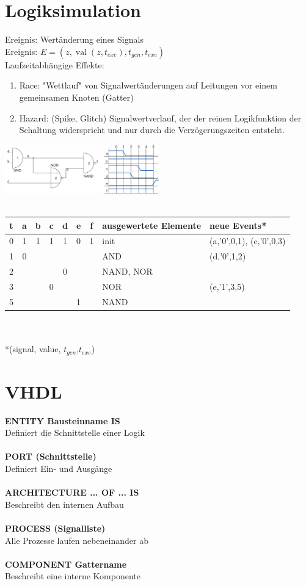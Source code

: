 \documentclass[a4paper,twocolumn,10pt]{article}
\DeclareMathOperator{\val}{val}
\begin{document}
\section*{Logiksimulation}
Ereignis: Wertänderung eines Signals\\
Ereignis: $E=(z, \val(z,t_{exe}),t_{gen},t_{exe})$\\
Laufzeitabhängige Effekte:
\begin{enumerate}
	\item Race: "Wettlauf" von Signalwertänderungen auf Leitungen vor einem gemeinsamen Knoten (Gatter)
	\item Hazard: (Spike, Glitch) Signalwertverlauf, der der reinen Logikfunktion der Schaltung widerspricht und nur durch die Verzögerungszeiten entsteht.
\end{enumerate}
\includegraphics[width=0.5\textwidth]{Grafiken/Logiksimulation}
\\ \\
\begin{tabular}{@{}|c|c|c|c|c|c|c|p{2.3cm}|p{2cm}|@{}}
\hline t & a & b & c & d & e & f & ausgewertete Elemente & neue Events* \\
\hline 0 & 1 & 1 & 1 & 1 & 0 & 1 & init & (a,'0',0,1), (c,'0',0,3) \\ 
\hline 1 & 0 &  &  &  &  &  & AND & (d,'0',1,2) \\ 
\hline 2 &  &  &  & 0 &  &  & NAND, NOR&  \\ 
\hline 3 &  &  & 0 &  &  &  & NOR & (e,'1',3,5) \\ 
\hline 5 &  &  &  &  & 1 &  & NAND &  \\ 
\hline 
\end{tabular}\\\\
*(signal, value, $t_{gen}$,$t_{exe}$)

\section*{VHDL}
{\small \textbf{ENTITY Bausteinname IS}}\\
Definiert die Schnittstelle einer Logik\\\\
{\small \textbf{PORT (Schnittstelle)}}\\
Definiert Ein- und Ausgänge\\\\
{\small \textbf{ARCHITECTURE ... OF ... IS}}\\
Beschreibt den internen Aufbau\\\\
{\small \textbf{PROCESS (Signalliste)}}\\
Alle Prozesse laufen nebeneinander ab\\\\
{\small \textbf{COMPONENT Gattername}}\\
Beschreibt eine interne Komponente
\end{document}
